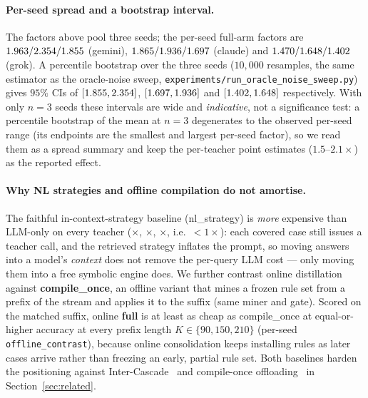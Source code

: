 \documentclass[11pt]{article}
\theoremstyle{plain}
\begin{document}
\paragraph{Per-seed spread and a bootstrap interval.} The factors above pool
three seeds; the per-seed full-arm factors are
$1.963/2.354/1.855$ (gemini),
$1.865/1.936/1.697$ (claude) and
$1.470/1.648/1.402$ (grok). A percentile
bootstrap over the three seeds ($10{,}000$ resamples, the same estimator as the
oracle-noise sweep, \texttt{experiments/run\_oracle\_noise\_sweep.py}) gives
$95\%$ CIs of $[1.855,2.354]$,
$[1.697,1.936]$ and
$[1.402,1.648]$ respectively. With only $n{=}3$ seeds
these intervals are wide and \emph{indicative}, not a significance test: a
percentile bootstrap of the mean at $n{=}3$ degenerates to the observed per-seed
range (its endpoints are the smallest and largest per-seed factor), so we read
them as a spread summary and keep the per-teacher point estimates
($1.5$--$2.1\times$) as the reported effect.

\paragraph{Why NL strategies and offline compilation do not amortise.} The
faithful in-context-strategy baseline (nl\_strategy) is \emph{more} expensive
than LLM-only on every teacher (\privNlGemini$\times$, \privNlClaude$\times$,
\privNlGrok$\times$, i.e.\ ${<}1\times$): each covered case still issues a
teacher call, and the retrieved strategy inflates the prompt, so moving answers
into a model's \emph{context} does not remove the per-query LLM cost --- only
moving them into a free symbolic engine does. We further contrast online
distillation against \textbf{compile\_once}, an offline variant that mines a
frozen rule set from a prefix of the stream and applies it to the suffix
(same miner and gate). Scored on the matched suffix, online \textbf{full} is at
least as cheap as compile\_once at equal-or-higher accuracy at every prefix
length $K\in\{90,150,210\}$ (per-seed \texttt{offline\_contrast}), because
online consolidation keeps installing rules as later cases arrive rather than
freezing an early, partial rule set. Both baselines harden the positioning
against Inter-Cascade~\citep{intercascade2025} and compile-once
offloading~\citep{legaloffload2026,reacomp2026} in
Section~\ref{sec:related}.
\end{document}
